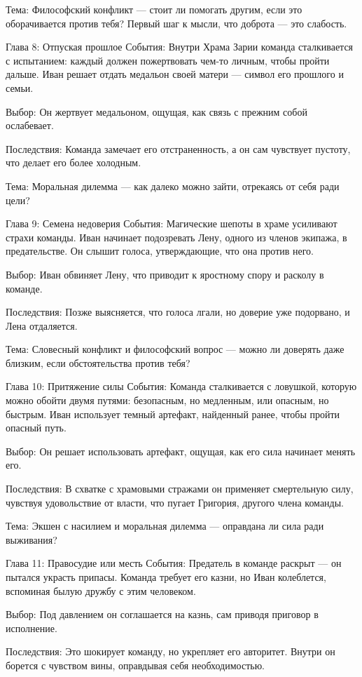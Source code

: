 \documentclass[12pt,a4paper]{book}
\begin{document}
Тема: Философский конфликт — стоит ли помогать другим, если это оборачивается против тебя? Первый шаг к мысли, что доброта — это слабость.

Глава 8: Отпуская прошлое
События: Внутри Храма Зарии команда сталкивается с испытанием: каждый должен пожертвовать чем-то личным, чтобы пройти дальше. Иван решает отдать медальон своей матери — символ его прошлого и семьи.

Выбор: Он жертвует медальоном, ощущая, как связь с прежним собой ослабевает.

Последствия: Команда замечает его отстраненность, а он сам чувствует пустоту, что делает его более холодным.

Тема: Моральная дилемма — как далеко можно зайти, отрекаясь от себя ради цели?

Глава 9: Семена недоверия
События: Магические шепоты в храме усиливают страхи команды. Иван начинает подозревать Лену, одного из членов экипажа, в предательстве. Он слышит голоса, утверждающие, что она против него.

Выбор: Иван обвиняет Лену, что приводит к яростному спору и расколу в команде.

Последствия: Позже выясняется, что голоса лгали, но доверие уже подорвано, и Лена отдаляется.

Тема: Словесный конфликт и философский вопрос — можно ли доверять даже близким, если обстоятельства против тебя?

Глава 10: Притяжение силы
События: Команда сталкивается с ловушкой, которую можно обойти двумя путями: безопасным, но медленным, или опасным, но быстрым. Иван использует темный артефакт, найденный ранее, чтобы пройти опасный путь.

Выбор: Он решает использовать артефакт, ощущая, как его сила начинает менять его.

Последствия: В схватке с храмовыми стражами он применяет смертельную силу, чувствуя удовольствие от власти, что пугает Григория, другого члена команды.

Тема: Экшен с насилием и моральная дилемма — оправдана ли сила ради выживания?

Глава 11: Правосудие или месть
События: Предатель в команде раскрыт — он пытался украсть припасы. Команда требует его казни, но Иван колеблется, вспоминая былую дружбу с этим человеком.

Выбор: Под давлением он соглашается на казнь, сам приводя приговор в исполнение.

Последствия: Это шокирует команду, но укрепляет его авторитет. Внутри он борется с чувством вины, оправдывая себя необходимостью.
\end{document}
